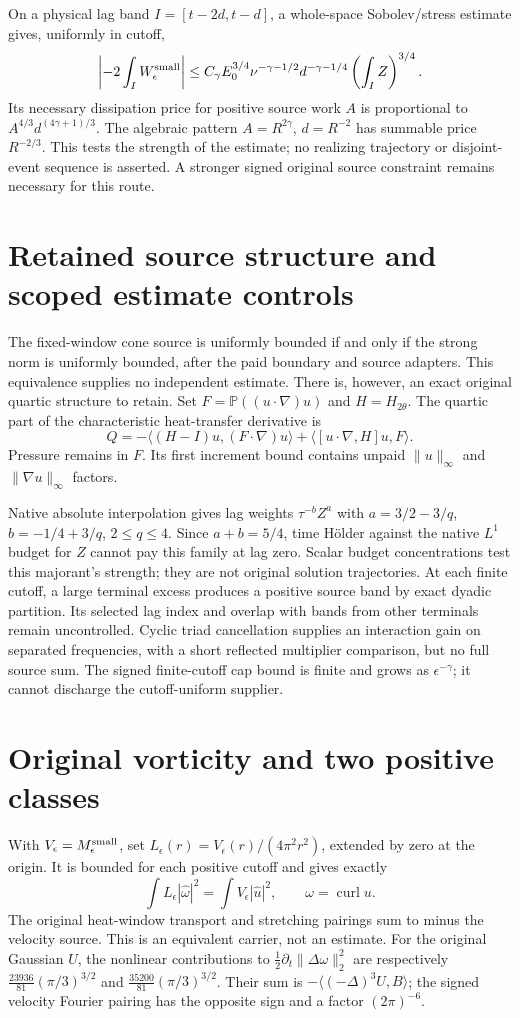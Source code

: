 \documentclass[11pt]{article}
\begin{document}
On a physical lag band $I=[t-2d,t-d]$, a whole-space Sobolev/stress estimate
gives, uniformly in cutoff,
\[
\left|-2\int_I W_\epsilon^{\rm small}\right|
 \le C_\gamma E_0^{3/4}\nu^{-\gamma-1/2}
       d^{-\gamma-1/4}\left(\int_I Z\right)^{3/4}.
\]
Its necessary dissipation price for positive source work $A$ is proportional
to $A^{4/3}d^{(4\gamma+1)/3}$. The algebraic pattern
$A=R^{2\gamma}$, $d=R^{-2}$ has summable price $R^{-2/3}$.
This tests the strength of the estimate; no realizing trajectory or
disjoint-event sequence is asserted. A stronger signed original source
constraint remains necessary for this route.

\section{Retained source structure and scoped estimate controls}
The fixed-window cone source is uniformly bounded if and only if the
strong norm is uniformly bounded, after the paid boundary and source
adapters. This equivalence supplies no independent estimate.
There is, however, an exact original quartic structure to retain.
Set $F=\mathbb P((u\cdot\nabla)u)$ and $H=H_{2\theta}$.
The quartic part of the characteristic heat-transfer derivative is
\[
Q=-\langle(H-I)u,(F\cdot\nabla)u\rangle
  +\langle[u\cdot\nabla,H]u,F\rangle.
\]
Pressure remains in $F$. Its first increment bound contains unpaid
$\|u\|_\infty$ and $\|\nabla u\|_\infty$ factors.

Native absolute interpolation gives lag weights $\tau^{-b}Z^a$ with
$a=3/2-3/q$, $b=-1/4+3/q$, $2\le q\le4$.
Since $a+b=5/4$, time H\"older against the native $L^1$ budget for $Z$
cannot pay this family at lag zero. Scalar budget concentrations test
this majorant's strength; they are not original solution trajectories.
At each finite cutoff, a large terminal excess produces a positive
source band by exact dyadic partition. Its selected lag index and overlap
with bands from other terminals remain uncontrolled. Cyclic triad
cancellation supplies an interaction gain on separated frequencies,
with a short reflected multiplier comparison, but no full source sum.
The signed finite-cutoff cap bound is finite and grows as
$\epsilon^{-\gamma}$; it cannot discharge the cutoff-uniform supplier.

\section{Original vorticity and two positive classes}
With $V_\epsilon=M_\epsilon^{\rm small}$, set
$L_\epsilon(r)=V_\epsilon(r)/(4\pi^2r^2)$, extended by zero at the origin.
It is bounded for each positive cutoff and gives exactly
\[
 \int L_\epsilon|\widehat\omega|^2
   =\int V_\epsilon|\widehat u|^2,\qquad \omega=\operatorname{curl}u.
\]
The original heat-window transport and stretching pairings sum to minus
the velocity source. This is an equivalent carrier, not an estimate.
For the original Gaussian $U$, the nonlinear contributions to
$\tfrac12\partial_t\|\Delta\omega\|_2^2$ are respectively
$\frac{23936}{81}(\pi/3)^{3/2}$ and
$\frac{35200}{81}(\pi/3)^{3/2}$. Their sum is
$-\langle(-\Delta)^3U,B\rangle$; the signed velocity Fourier pairing
has the opposite sign and a factor $(2\pi)^{-6}$.
\end{document}
